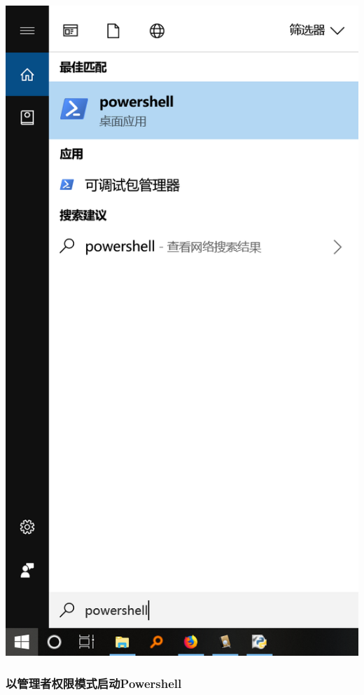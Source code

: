 \documentclass[11pt]{ctexart}
\makeatletter
\def\maxwidth{\ifdim\Gin@nat@width>\linewidth\linewidth
    \else\Gin@nat@width\fi}
\let\Oldincludegraphics\includegraphics
\renewcommand{\includegraphics}[1]{\Oldincludegraphics[width=.8\maxwidth]{#1}}
\makeatother
\begin{document}
\includegraphics{image/ps1.png}

    \hypertarget{ux4ee5ux7ba1ux7406ux8005ux6743ux9650ux6a21ux5f0fux542fux52a8powershell}{%
\subsubsection{以管理者权限模式启动Powershell}\label{ux4ee5ux7ba1ux7406ux8005ux6743ux9650ux6a21ux5f0fux542fux52a8powershell}}
\end{document}
